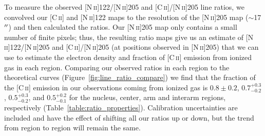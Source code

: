 To measure the observed [N\,\textsc{ii}]122/[N\,\textsc{ii}]205 and [C\,\textsc{ii}]/[N\,\textsc{ii}]205 line ratios, we convolved our [C\,\textsc{ii}] and [N\,\textsc{ii}]122 maps to the resolution of the [N\,\textsc{ii}]205 map ($\sim$17$\mbox{$^{\prime\prime}$}$) and then calculated the ratios.  Our [N\,\textsc{ii}]205 map only contains a small number of finite pixels; thus, the resulting ratio maps give us an estimate of [N\,\textsc{ii}]122/[N\,\textsc{ii}]205 and [C\,\textsc{ii}]/[N\,\textsc{ii}]205 (at positions observed in [N\,\textsc{ii}]205) that we can use to estimate the electron density and fraction of [C\,\textsc{ii}] emission from ionized gas in each region.  Comparing our observed ratios in each region to the theoretical curves (Figure~\ref{fig:line_ratio_compare}) we find that the fraction of the [C\,\textsc{ii}] emission in our observations coming from ionized gas is $0.8 \pm 0.2$, $0.7^{+0.3}_{-0.2}$, $0.5^{+0.3}_{-0.2}$, and $0.5^{+0.2}_{-0.1}$ for the nucleus, center, arm and interarm regions, respectively (Table~\ref{table:ratio_properties}).  Calibration uncertainties are included and have the effect of shifting all our ratios up or down, but the trend from region to region will remain the same.

